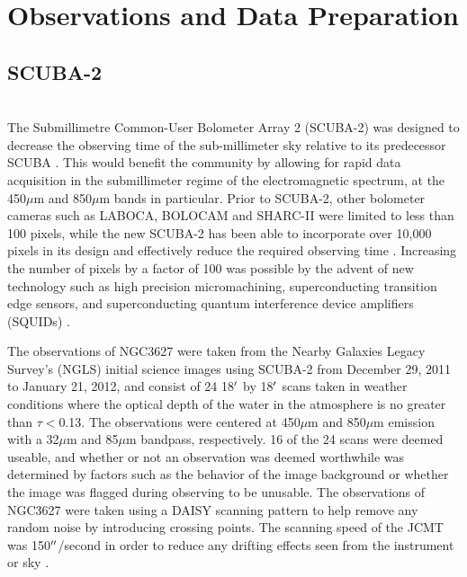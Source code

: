 \chapter{Observations and Data Preparation}\label{observations}

\section{SCUBA-2} \\
The Submillimetre Common-User Bolometer Array 2 (SCUBA-2) was designed to decrease the observing time of the sub-millimeter sky relative to its predecessor SCUBA \citep{holland2013}.  This would benefit the community by allowing for rapid data acquisition in the submillimeter regime of the electromagnetic spectrum, at the 450$\mu$m and 850$\mu$m bands in particular.  Prior to SCUBA-2, other bolometer cameras such as LABOCA, BOLOCAM and SHARC-II were limited to less than 100 pixels, while the new SCUBA-2 has been able to incorporate over 10,000 pixels in its design and effectively reduce the required observing time \citep{chapin2013}.  Increasing the number of pixels by a factor of 100 was possible by the advent of new technology such as high precision micromachining, superconducting transition edge sensors, and superconducting quantum interference device amplifiers (SQUIDs) \citep{holland2013}.

The observations of NGC3627 were taken from the Nearby Galaxies Legacy Survey's (NGLS) initial science images using SCUBA-2 from December 29, 2011  to January 21, 2012, and consist of 24 18$\mbox{$^\prime$}$ by 18$\mbox{$^\prime$}$ scans taken in weather conditions where the optical depth of the water in the atmosphere is no greater than $\tau<$0.13.  The observations were centered at 450$\mu$m and 850$\mu$m emission with a 32$\mu$m and 85$\mu$m bandpass, respectively.  16 of the 24 scans were deemed useable, and whether or not an observation was deemed worthwhile was determined by factors such as the behavior of the image background or whether the image was flagged during observing to be unusable.  The observations of NGC3627 were taken using a DAISY scanning pattern  to help remove any random noise by introducing crossing points.  The scanning speed of the JCMT was 150$\mbox{$^{\prime\prime}$}$/second in order to reduce any drifting effects seen from the instrument or sky \citep{chapin2013}.

